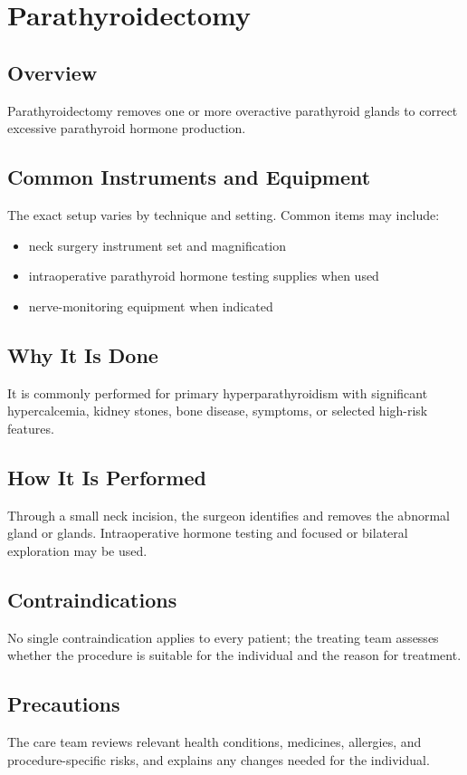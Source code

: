 \chapter{Parathyroidectomy}
\section*{Overview}
Parathyroidectomy removes one or more overactive parathyroid glands to correct excessive parathyroid hormone production.
\section*{Common Instruments and Equipment}
The exact setup varies by technique and setting. Common items may include:
\begin{itemize}[nosep,leftmargin=*]
  \item neck surgery instrument set and magnification
  \item intraoperative parathyroid hormone testing supplies when used
  \item nerve-monitoring equipment when indicated
\end{itemize}

\section*{Why It Is Done}
It is commonly performed for primary hyperparathyroidism with significant hypercalcemia, kidney stones, bone disease, symptoms, or selected high-risk features.
\section*{How It Is Performed}
Through a small neck incision, the surgeon identifies and removes the abnormal gland or glands. Intraoperative hormone testing and focused or bilateral exploration may be used.
\section*{Contraindications}
No single contraindication applies to every patient; the treating team assesses whether the procedure is suitable for the individual and the reason for treatment.

\section*{Precautions}
The care team reviews relevant health conditions, medicines, allergies, and procedure-specific risks, and explains any changes needed for the individual.


